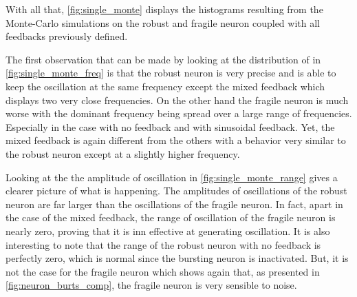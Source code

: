 With all that, \cref{fig:single_monte} displays the histograms resulting from the Monte-Carlo simulations on the robust and fragile neuron coupled with all feedbacks previously defined. 

The first observation that can be made by looking at the distribution of in \cref{fig:single_monte_freq} is that the robust neuron is very precise and is able to keep the oscillation at the same frequency except the mixed feedback which displays two very close frequencies. 
On the other hand the fragile neuron is much worse with the dominant frequency being spread over a large range of frequencies. 
Especially in the case with no feedback and with sinusoidal feedback. 
Yet, the mixed feedback is again different from the others with a behavior very similar to the robust neuron except at a slightly higher frequency.

Looking at the the amplitude of oscillation in \cref{fig:single_monte_range} gives a clearer picture of what is happening. 
The amplitudes of oscillations of the robust neuron are far larger than the oscillations of the fragile neuron. 
In fact, apart in the case of the mixed feedback, the range of oscillation of the fragile neuron is nearly zero, proving that it is inn effective at generating oscillation.
It is also interesting to note that the range of the robust neuron with no feedback is perfectly zero, which is normal since the bursting neuron is inactivated. 
But, it is not the case for the fragile neuron which shows again that, as presented in \cref{fig:neuron_burts_comp}, the fragile neuron is very sensible to noise.

